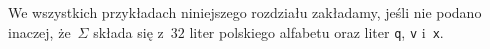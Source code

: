 \documentclass{praca1}
\begin{document}
We wszystkich przykładach niniejszego rozdziału zakładamy, jeśli nie podano inaczej, że~$\Sigma$ składa się z~$32$ liter polskiego alfabetu oraz liter \verb|q|, \verb|v| i~\verb|x|.



%
\end{document}
